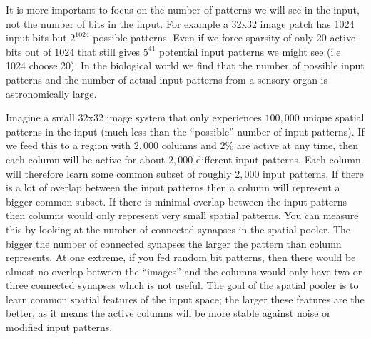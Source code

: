 \documentclass{report}
\begin{document}
It is more important to focus on the number of patterns we will see in the
input, not the number of bits in the input. For example a 32x32 image patch
has 1024 input bits but $2^{1024}$  possible patterns.  Even if we force
sparsity of only 20 active bits out of 1024 that still gives $5^{41}$ potential
input patterns we might see (i.e. 1024 choose 20).  In the biological world
we find that the number of possible input patterns and the number of actual
input patterns from a sensory organ is astronomically large.


Imagine a small 32x32 image system that only experiences $100,000$ unique
spatial patterns in the input (much less than the ``possible'' number of input
patterns).  If we feed this to a region with $2,000$ columns and 2\% are active
at any time, then each column will be active for about $2,000$ different input
patterns.  Each column will therefore learn some common subset of roughly
$2,000$ input patterns.  If there is a lot of overlap between the input
patterns then a column will represent a bigger common subset.  If there is
minimal overlap between the input patterns then columns would only
represent very small spatial patterns.  You can measure this by looking at
the number of connected synapses in the spatial pooler.  The bigger the
number of connected synapses the larger the pattern than column represents.
At one extreme, if you fed random bit patterns, then there would be almost
no overlap between the ``images'' and the columns would only have two or
three connected synapses which is not useful.  The goal of the spatial pooler
is to learn common spatial features of the input space; the larger these features
are the better, as it means the active columns will be more stable against
noise or modified input patterns.
\end{document}
